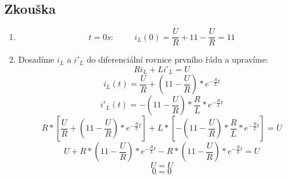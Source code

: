 \documentclass[a4paper]{article}
\begin{document}
\vspace{1cm}
\subsection{Zkouška}
\begin{enumerate}[label=\alph*)]
    \item 
    \[t = 0s: \hspace{1cm} i_L(0) = \frac{U}{R} + 11 - \frac{U}{R} = 11\]
    
    \item
    Dosadíme $i_L$ a $i'_L$ do diferenciální rovnice prvního řádu a upravíme:
    \[Ri_L +  Li'_L = U\]
    \[i_L(t) = \frac{U}{R} + \left(11 - \frac{U}{R}\right) * e^{-\frac{R}{L}t}\]
    \[i'_L(t) = -\left(11 - \frac{U}{R}\right) * \frac{R}{L} * e^{-\frac{R}{L}t}\]
    \vspace{1cm}
    \[R * \left[ \frac{U}{R} + \left(11 - \frac{U}{R}\right) * e^{-\frac{R}{L}t} \right] +  L * \left[ -\left(11 - \frac{U}{R}\right) * \frac{R}{L} * e^{-\frac{R}{L}t} \right] = U\]
    \[U + R * \left(11 - \frac{U}{R}\right) * e^{-\frac{R}{L}t} - R * \left(11 - \frac{U}{R}\right) * e^{-\frac{R}{L}t} = U\]
    \[U = U\]
    \[0 = 0\]
\end{enumerate}

\newpage
\end{document}
